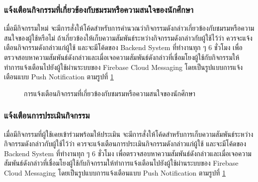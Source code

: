 \documentclass[14pt,oneside,openright,a4paper]{cpe-thai-project}
\begin{document}
\subsubsection{แจ้งเตือนกิจกรรมที่เกี่ยวข้องกับชมรมหรือความสนใจของนักศึกษา}
เมื่อมีกิจกรรมใหม่ จะมีการสั่งให้โค้ดสำหรับการคำนวณว่ากิจกรรมดังกล่าวเกี่ยวข้องกับชมรมหรือความสนใจของผู้ใช้หรือไม่ ถ้าเกี่ยวข้องให้เก็บความสัมพันธ์ระหว่างกิจกรรมดังกล่าวกับผู้ใช้ไว้ว่า ควรจะแจ้งเตือนกิจกรรมดังกล่าวแก่ผู้ใช้ และจะมีโค้ดของ Backend System ที่ทำงานทุก ๆ 6 ชั่วโมง เพื่อตรวจสอบหาความสัมพันธ์ดังกล่าวและเมื่อเจอความสัมพันธ์ดังกล่าวที่เชื่อมโยงผู้ใช้กับกิจกรรมให้ทำการแจ้งเตือนไปยังผู้ใช้ผ่านระบบของ Firebase Cloud Messaging โดยเป็นรูปแบบการแจ้งเตือนแบบ Push Notification ตามรูปที่ \ref{fig:18}
\begin{figure}[H]\centering
  \setlength{\fboxrule}{0.5mm}
  \setlength{\fboxsep}{0.5cm}
  \caption{การแจ้งเตือนกิจกรรมที่เกี่ยวข้องกับชมรมหรือความสนใจของนักศึกษา}\label{fig:18}
\end{figure}

\subsubsection{แจ้งเตือนการประเมินกิจกรรม}
เมื่อมีกิจกรรมที่ผู้ใช้เคยเข้าร่วมพร้อมให้ประเมิน จะมีการสั่งให้โค้ดสำหรับการเก็บความสัมพันธ์ระหว่างกิจกรรมดังกล่าวกับผู้ใช้ไว้ว่า ควรจะแจ้งเตือนการประเมินกิจกรรมดังกล่าวแก่ผู้ใช้ และจะมีโค้ดของ Backend System ที่ทำงานทุก ๆ 6 ชั่วโมง เพื่อตรวจสอบหาความสัมพันธ์ดังกล่าวและเมื่อเจอความสัมพันธ์ดังกล่าวที่เชื่อมโยงผู้ใช้กับกิจกรรมให้ทำการแจ้งเตือนไปยังผู้ใช้ผ่านระบบของ Firebase Cloud Messaging โดยเป็นรูปแบบการแจ้งเตือนแบบ Push Notification ตามรูปที่ \ref{fig:18}
\end{document}
